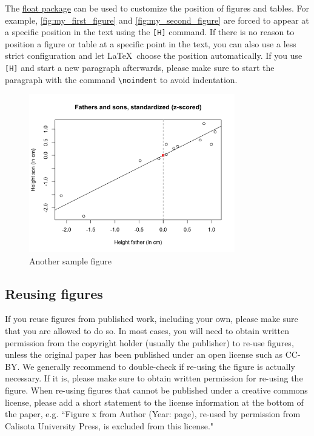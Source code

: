 \noindent The \href{https://ftp.tu-chemnitz.de/pub/tex/macros/latex/contrib/float/float.pdf}{float package} can be used to customize the position of figures and tables. For example, \autoref{fig:my_first_figure} and \autoref{fig:my_second_figure} are forced to appear at a specific position in the text using the \verb![H]! command. If there is no reason to position a figure or table at a specific point in the text, you can also use a less strict configuration and let \LaTeX \  choose the position automatically. If you use \verb![H]! and start a new paragraph afterwards, please make sure to start the paragraph with the command \verb!\noindent! to avoid indentation.

\begin{figure}[H]
    \centering
    \includegraphics[width=0.8\textwidth]{Figures/fathersandsons4.png}
    \caption{Another sample figure}
    \label{fig:my_second_figure}
\end{figure}

\subsection*{Reusing figures} \label{sec:reusing}

If you reuse figures from published work, including your own, please make sure that you are allowed to do so. In most cases, you will need to obtain written permission from the copyright holder (usually the publisher) to re-use figures, unless the original paper has been published under an open license such as CC-BY. We generally recommend to double-check if re-using the figure is actually necessary. If it is, please make sure to obtain written permission for re-using the figure. When re-using figures that cannot be published under a creative commons license, please add a short statement to the license information at the bottom of the paper, e.g. ``Figure x from Author (Year: page), re-used by permission from Calisota University Press, is excluded from this license."


